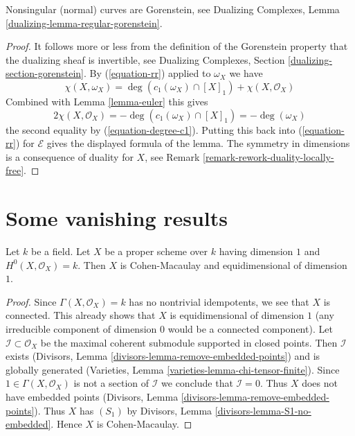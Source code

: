 \noindent
Nonsingular (normal) curves are Gorenstein, see
Dualizing Complexes, Lemma \ref{dualizing-lemma-regular-gorenstein}.

\begin{proof}
It follows more or less from the definition of the Gorenstein property
that the dualizing sheaf is invertible, see
Dualizing Complexes, Section \ref{dualizing-section-gorenstein}.
By (\ref{equation-rr}) applied to $\omega_X$ we have
$$
\chi(X, \omega_X) = 
\deg(c_1(\omega_X) \cap [X]_1) + \chi(X, \mathcal{O}_X)
$$
Combined with Lemma \ref{lemma-euler} this gives
$$
2\chi(X, \mathcal{O}_X) = - \deg(c_1(\omega_X) \cap [X]_1) = - \deg(\omega_X)
$$
the second equality by (\ref{equation-degree-c1}). Putting this back into
(\ref{equation-rr}) for $\mathcal{E}$ gives the displayed formula of the lemma.
The symmetry in dimensions is a consequence of duality for $X$, see
Remark \ref{remark-rework-duality-locally-free}.
\end{proof}




\section{Some vanishing results}
\label{section-vanishing}

\begin{lemma}
\label{lemma-automatic}
Let $k$ be a field. Let $X$ be a proper scheme over $k$ having dimension $1$
and $H^0(X, \mathcal{O}_X) = k$. Then $X$ is Cohen-Macaulay
and equidimensional of dimension $1$.
\end{lemma}

\begin{proof}
Since $\Gamma(X, \mathcal{O}_X) = k$ has no nontrivial idempotents,
we see that $X$ is connected. This already shows that $X$ is
equidimensional of dimension $1$ (any irreducible component
of dimension $0$ would be a connected component).
Let $\mathcal{I} \subset \mathcal{O}_X$
be the maximal coherent submodule supported in closed points.
Then $\mathcal{I}$ exists
(Divisors, Lemma \ref{divisors-lemma-remove-embedded-points})
and is globally generated
(Varieties, Lemma \ref{varieties-lemma-chi-tensor-finite}).
Since $1 \in \Gamma(X, \mathcal{O}_X)$ is not a section
of $\mathcal{I}$ we conclude that $\mathcal{I} = 0$.
Thus $X$ does not have embedded points
(Divisors, Lemma \ref{divisors-lemma-remove-embedded-points}).
Thus $X$ has $(S_1)$ by
Divisors, Lemma \ref{divisors-lemma-S1-no-embedded}.
Hence $X$ is Cohen-Macaulay.
\end{proof}


